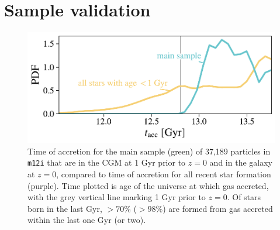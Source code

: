 \documentclass[fleqn,usenatbib]{mnras}
\begin{document}
\section{Sample validation}
\label{s: appendix-sample validation}

\begin{figure}
    \centering
    \includegraphics[width=\columnwidth]{figures/selected_to_all_comparison/tacc_m12i_md.pdf}
    \caption{
    Time of accretion for the main sample (green) of 37,189 particles in \texttt{m12i} that are in the CGM at 1 Gyr prior to $z=0$ and in the galaxy at $z=0$, compared to time of accretion for all recent star formation (purple).
    Time plotted is age of the universe at which gas accreted, with the grey vertical line marking 1 Gyr prior to $z=0$.
    Of stars born in the last Gyr, $> 70\%$ ($> 98\%$) are formed from gas accreted within the last one Gyr (or two).
    }
    \label{f: sample validation -- tacc}
\end{figure}
\end{document}
